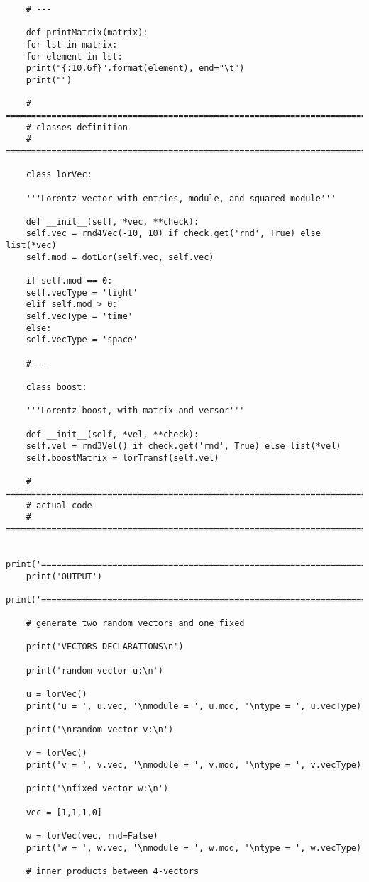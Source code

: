 \documentclass[12pt]{report}
\begin{document}
\begin{verbatim}
	# ---
	
	def printMatrix(matrix):
	for lst in matrix:
	for element in lst:
	print("{:10.6f}".format(element), end="\t")
	print("")
	
	# =============================================================================
	# classes definition
	# =============================================================================
	
	class lorVec:
	
	'''Lorentz vector with entries, module, and squared module'''
	
	def __init__(self, *vec, **check):
	self.vec = rnd4Vec(-10, 10) if check.get('rnd', True) else list(*vec)
	self.mod = dotLor(self.vec, self.vec)
	
	if self.mod == 0:
	self.vecType = 'light'
	elif self.mod > 0:
	self.vecType = 'time'
	else:
	self.vecType = 'space'
	
	# ---
	
	class boost:
	
	'''Lorentz boost, with matrix and versor'''
	
	def __init__(self, *vel, **check):
	self.vel = rnd3Vel() if check.get('rnd', True) else list(*vel)
	self.boostMatrix = lorTransf(self.vel)
	
	# =============================================================================
	# actual code
	# =============================================================================
	
	print('======================================================================')
	print('OUTPUT')
	print('======================================================================')
	
	# generate two random vectors and one fixed
	
	print('VECTORS DECLARATIONS\n')
	
	print('random vector u:\n')
	
	u = lorVec()
	print('u = ', u.vec, '\nmodule = ', u.mod, '\ntype = ', u.vecType)
	
	print('\nrandom vector v:\n')
	
	v = lorVec()
	print('v = ', v.vec, '\nmodule = ', v.mod, '\ntype = ', v.vecType)
	
	print('\nfixed vector w:\n')
	
	vec = [1,1,1,0]
	
	w = lorVec(vec, rnd=False)
	print('w = ', w.vec, '\nmodule = ', w.mod, '\ntype = ', w.vecType)
	
	# inner products between 4-vectors
	

\end{verbatim}
\end{document}
